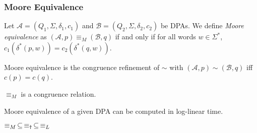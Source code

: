 \vspace{5pt}

\subsubsection{Moore Equivalence}

\begin{defn}
	Let $\mathcal{A} = (Q_1, \Sigma, \delta_1, c_1)$ and $\mathcal{B} = (Q_2, \Sigma, \delta_2, c_2)$ be DPAs. We define \emph{Moore equivalence} as $(\mathcal{A}, p) \equiv_M (\mathcal{B}, q)$ if and only if for all words $w \in \Sigma^*$, $c_1(\delta^*(p, w)) = c_2(\delta^*(q, w))$.
\end{defn}

\begin{lem}
	Moore equivalence is the congruence refinement of $\sim$ with $(\mathcal{A}, p) \sim (\mathcal{B}, q)$ iff $c(p) = c(q)$.
\end{lem}

\begin{cor}
	$\equiv_M$ is a congruence relation.
	\label{cor:general:M_congruence}
\end{cor}

\begin{cor}
	Moore equivalence of a given DPA can be computed in log-linear time.
\end{cor}



\vspace{10pt}

\begin{theorem}
	$\equiv_M \,\subseteq\, \equiv_\text{\Ankh} \,\subseteq\, \equiv_L$
	\label{thm:general:M_subs_Ankh_subs_L}
\end{theorem}

